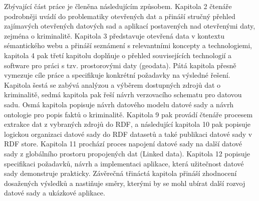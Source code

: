 Zbývající část práce je členěna následujícím způsobem. Kapitola 2 čtenáře podrobněji uvádí do problematiky otevřených dat a přináší stručný přehled zajímavých otevřených datových sad a aplikací postavených nad otevřenými daty, zejména o kriminalitě. Kapitola 3 představuje otevřená data v kontextu sémantického webu a přináší seznámení s relevantními koncepty a technologiemi, kapitola 4 pak třetí kapitolu doplňuje o přehled souvisejících technologií a software pro práci s tzv. prostorovými daty (geodata). Pátá kapitola přesně vymezuje cíle práce a specifikuje konkrétní požadavky na výsledné řešení. Kapitola šestá se zabývá analýzou a výběrem dostupných zdrojů dat o kriminalitě, sedmá kapitola pak řeší návrh verzovacího schematu pro datovou sadu. Osmá kapitola popisuje návrh datového modelu datové sady a návrh ontologie pro popis faktů o kriminalitě. Kapitola 9 pak provádí čtenáře procesem extrakce dat z vybraných zdrojů do RDF, a následující kapitola 10 pak popisuje logickou organizaci datové sady do RDF datasetů a také publikaci datové sady v RDF store. Kapitola 11 prochází proces napojení datové sady na další datové sady z globálního prostoru propojených dat (Linked data). Kapitola 12 popisuje specifikaci požadavků, návrh a implementaci aplikace, která užitečnost datové sady demonstruje prakticky. Závěrečná třináctá kapitola přináší zhodnocení dosažených výsledků a nastiňuje směry, kterými by se mohl ubírat další rozvoj datové sady a ukázkové aplikace.